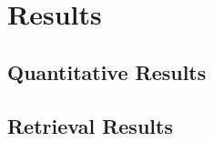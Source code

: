 \section{Results}\label{sec:results}

\subsection{Quantitative Results}

\subsection{Retrieval Results}